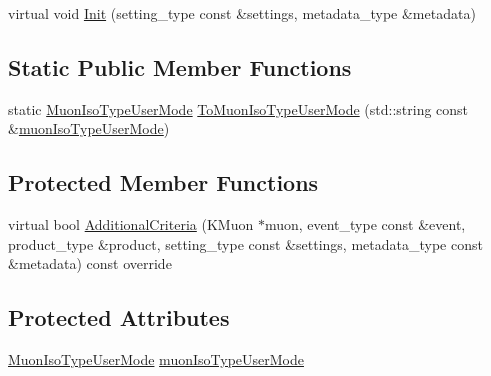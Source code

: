 \begin{DoxyCompactItemize}
\item 
virtual void \hyperlink{classHttValidMuonsProducer_aa37cabc89fdfbf3be64a97020edf93de}{Init} (setting\_\-type const \&settings, metadata\_\-type \&metadata)
\end{DoxyCompactItemize}
\subsection*{Static Public Member Functions}
\begin{DoxyCompactItemize}
\item 
static \hyperlink{classHttValidMuonsProducer_aad2635063bc018555daf5c7e0eeeef9d}{MuonIsoTypeUserMode} \hyperlink{classHttValidMuonsProducer_a0ef099aa63658c2b4c17baa8128dad2c}{ToMuonIsoTypeUserMode} (std::string const \&\hyperlink{classHttValidMuonsProducer_a22ca8a17ba77169e7c70aed8dfb77e75}{muonIsoTypeUserMode})
\end{DoxyCompactItemize}
\subsection*{Protected Member Functions}
\begin{DoxyCompactItemize}
\item 
virtual bool \hyperlink{classHttValidMuonsProducer_ac19593568471fd88ba6acf3a355f0dab}{AdditionalCriteria} (KMuon $\ast$muon, event\_\-type const \&event, product\_\-type \&product, setting\_\-type const \&settings, metadata\_\-type const \&metadata) const override
\end{DoxyCompactItemize}
\subsection*{Protected Attributes}
\begin{DoxyCompactItemize}
\item 
\hyperlink{classHttValidMuonsProducer_aad2635063bc018555daf5c7e0eeeef9d}{MuonIsoTypeUserMode} \hyperlink{classHttValidMuonsProducer_a22ca8a17ba77169e7c70aed8dfb77e75}{muonIsoTypeUserMode}
\end{DoxyCompactItemize}


